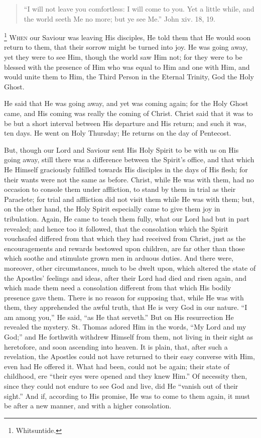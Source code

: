 
\begin{quote}

``I will not leave you comfortless: I will come to you. Yet a
little while, and the world seeth Me no more; but ye see Me.''
John xiv. 18, 19.

\end{quote}

\footnote{Whitsuntide.} W\textsc{hen} our Saviour was leaving His disciples, He told them that He
would soon return to them, that their sorrow might be turned into joy.
He was going away, yet they were to see Him, though the world saw Him
not; for they were to be blessed with the presence of Him who was
equal to Him and one with Him, and would unite them to Him, the Third
Person in the Eternal Trinity, God the Holy Ghost.

He said that He was going away, and yet was coming again; for the
Holy Ghost came, and His coming was really the coming of Christ.
Christ said that it was to be but a short interval between His
departure and His return; and such it was, ten days. He went on Holy
Thursday; He returns on the day of Pentecost.

But, though our Lord and Saviour sent His Holy Spirit to be with us
on His going away, still there was a difference between the Spirit's
office, and that which He Himself graciously fulfilled towards His
disciples in the days of His flesh; for their wants were not the same
as before. Christ, while He was with them, had no occasion to console
them under affliction, to stand by them in trial as their Paraclete;
for trial and affliction did not visit them while He was with them;
but, on the other hand, the Holy Spirit especially came to give them
joy in tribulation. Again, He came to teach them fully, what our Lord
had but in part revealed; and hence too it followed, that the
consolation which the Spirit vouchsafed differed from that which they
had received from Christ, just as the encouragements and rewards
bestowed upon children, are far other than those which soothe and
stimulate grown men in arduous duties. And there were, moreover, other
circumstances, much to be dwelt upon, which altered the state of the
Apostles' feelings and ideas, after their Lord had died and risen
again, and which made them need a consolation different from that
which His bodily presence gave them. There is no reason for supposing
that, while He was with them, they apprehended the awful truth, that
He is very God in our nature. ``I am among you,'' He said,
``as He that serveth.'' But on His resurrection He revealed
the mystery. St. Thomas adored Him in the words, ``My Lord and my
God;'' and He forthwith withdrew Himself from them, not living in
their sight as heretofore, and soon ascending into heaven. It is plain, that, after such a revelation, the Apostles could not have
returned to their easy converse with Him, even had He offered it. What
had been, could not be again; their state of childhood, ere
``their eyes were opened and they knew Him.'' Of necessity
then, since they could not endure to see God and live, did He
``vanish out of their sight.'' And if, according to His
promise, He was to come to them again, it must be after a new manner,
and with a higher consolation.

